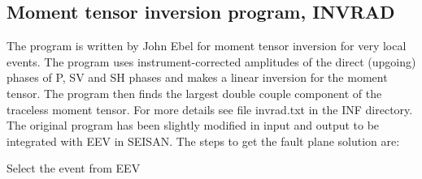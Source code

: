 
\subsection{Moment tensor inversion program, INVRAD}
\label{INVRAD} 

The program is written by John Ebel \citep{ebel1990} for moment tensor inversion for very local events. The program uses instrument-corrected amplitudes of the direct (upgoing) phases of P, SV and SH phases and makes a linear inversion for the moment tensor. The program then finds the largest double couple component of the traceless moment tensor. For more details see file invrad.txt in the INF directory.\newline
The original program has been slightly modified in input and output to be integrated with EEV in SEISAN. The steps to get the fault plane solution are: 

Select the event from EEV 

